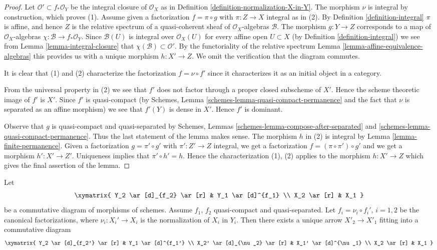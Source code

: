 \begin{proof}
Let $\mathcal{O}' \subset f_*\mathcal{O}_Y$ be the integral closure of
$\mathcal{O}_X$ as in Definition \ref{definition-normalization-X-in-Y}.
The morphism $\nu$ is integral by construction, which proves (1).
Assume given a factorization $f = \pi \circ g$ with $\pi : Z \to X$
integral as in (2). By Definition \ref{definition-integral}
$\pi$ is affine, and hence $Z$ is the relative
spectrum of a quasi-coherent sheaf of $\mathcal{O}_X$-algebras $\mathcal{B}$.
The morphism $g : Y \to Z$ corresponds to a map of $\mathcal{O}_X$-algebras
$\chi : \mathcal{B} \to f_*\mathcal{O}_Y$. Since $\mathcal{B}(U)$ is
integral over $\mathcal{O}_X(U)$ for every affine open $U \subset X$
(by Definition \ref{definition-integral})
we see from Lemma \ref{lemma-integral-closure}
that $\chi(\mathcal{B}) \subset \mathcal{O}'$.
By the functoriality of the relative spectrum
Lemma \ref{lemma-affine-equivalence-algebras}
this provides us with a unique morphism
$h : X' \to Z$. We omit the verification that the diagram commutes.

\medskip\noindent
It is clear that (1) and (2) characterize the factorization $f = \nu \circ f'$
since it characterizes it as an initial object in a category.

\medskip\noindent
From the universal property in (2) we see that $f'$ does not factor through
a proper closed subscheme of $X'$. Hence the scheme theoretic image of $f'$
is $X'$. Since $f'$ is quasi-compact (by Schemes, Lemma
\ref{schemes-lemma-quasi-compact-permanence} and the fact that $\nu$ is
separated as an affine morphism) we see that $f'(Y)$ is dense in $X'$.
Hence $f'$ is dominant.

\medskip\noindent
Observe that $g$ is quasi-compact and quasi-separated by
Schemes, Lemmas \ref{schemes-lemma-compose-after-separated} and
\ref{schemes-lemma-quasi-compact-permanence}. Thus the last statement
of the lemma makes sense.
The morphism $h$ in (2) is integral by Lemma \ref{lemma-finite-permanence}.
Given a factorization $g = \pi' \circ g'$ with $\pi' : Z' \to Z$
integral, we get a factorization $f = (\pi \circ \pi') \circ g'$ and
we get a morphism $h' : X' \to Z'$. Uniqueness implies that
$\pi' \circ h' = h$. Hence the characterization (1), (2) applies
to the morphism $h : X' \to Z$ which gives the final assertion of the lemma.
\end{proof}

\begin{lemma}
\label{lemma-functoriality-normalization}
Let
$$
\xymatrix{
Y_2 \ar[d]_{f_2} \ar[r] & Y_1 \ar[d]^{f_1} \\
X_2 \ar[r] & X_1
}
$$
be a commutative diagram of morphisms of schemes.
Assume $f_1$, $f_2$ quasi-compact and quasi-separated.
Let $f_i = \nu_i \circ f_i'$, $i = 1, 2$
be the canonical factorizations, where $\nu_i : X_i' \to X_i$ is
the normalization of $X_i$ in $Y_i$. Then there exists a unique
arrow $X'_2 \to X'_1$ fitting into a
commutative diagram
$$
\xymatrix{
Y_2 \ar[d]_{f_2'} \ar[r] & Y_1 \ar[d]^{f_1'} \\
X_2' \ar[d]_{\nu_2} \ar[r] & X_1' \ar[d]^{\nu_1} \\
X_2 \ar[r] & X_1
}
$$
\end{lemma}

